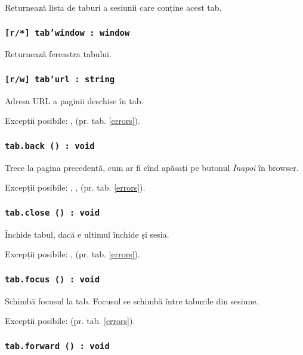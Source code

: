 Returnează lista de taburi a sesiunii care conține acest tab.

\subsubsection{\texttt{[r/*] tab'window : window}}

Returnează fereastra tabului.

\subsubsection{\texttt{[r/w] tab'url : string}}

Adresa URL a paginii deschise în tab.

Excepții posibile: ,  (pr. tab. \ref{errors}).

\subsubsection{\texttt{tab.back () : void}}

Trece la pagina precedentă, cum ar fi cînd apăsați pe butonul \textit{Înapoi} în browser.

Excepții posibile: , ,  (pr. tab. \ref{errors}).

\subsubsection{\texttt{tab.close () : void}}

Închide tabul, dacă e ultimul închide și sesia.

Excepții posibile: ,  (pr. tab. \ref{errors}).

\subsubsection{\texttt{tab.focus () : void}}

Schimbă focusul la tab. Focusul se schimbă între taburile din sesiune.

Excepții posibile:  (pr. tab. \ref{errors}).

\subsubsection{\texttt{tab.forward () : void}}

